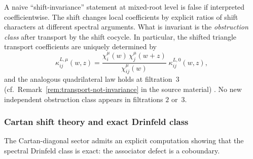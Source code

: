 \begin{remark}
\label{rem:spectral-shift-transport}
A naive ``shift-invariance'' statement at mixed-root level is
false if interpreted coefficientwise. The shift changes local
coefficients by explicit ratios of shift characters at different
spectral arguments. What is invariant is the
\emph{obstruction class} after transport by the shift cocycle.
In particular, the shifted triangle transport coefficients
are uniquely determined by
\[
 \kappa_{ij}^{L,\mu}(w,z)
 =
 \frac{\chi_i^\mu(w)\,\chi_j^\mu(w+z)}{\chi_{ij}^\mu(w)}
 \;\kappa_{ij}^{L,0}(w,z),
\]
and the analogous quadrilateral law holds at filtration~$3$
\ifannalsedition\else
(cf.\ Remark~\ref{rem:transport-not-invariance}
in the source material)
\fi. No new independent obstruction class
appears in filtrations $2$ or~$3$.
\end{remark}

\subsubsection{Cartan shift theory and exact Drinfeld class}

The Cartan-diagonal sector admits an explicit computation
showing that the spectral Drinfeld class is exact: the
associator defect is a coboundary.

